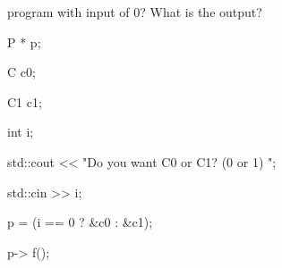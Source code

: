program with input of 0? What is the output?



\begin{console}

P * p;

C c0;

C1 c1;

int i;

std::cout << "Do you want C0 or C1? (0 or 1) ";

std::cin >> i;

p = (i == 0 ? &c0 : &c1);

p-> f();

\end{console}

